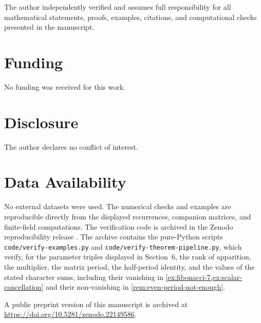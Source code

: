 \documentclass[11pt]{article}
\theoremstyle{plain}
\theoremstyle{definition}
\begin{document}
The author independently verified and assumes full responsibility for all
mathematical statements, proofs, examples, citations, and computational
checks presented in the manuscript.


\section*{Funding}

No funding was received for this work.

\section*{Disclosure}

The author declares no conflict of interest.


\section*{Data Availability}

No external datasets were used. The numerical checks and examples are
reproducible directly from the displayed recurrences, companion matrices,
and finite-field computations. The verification code is archived in the
Zenodo reproducibility release \cite{Ghandali2026HalfPeriodSoftware}. The
archive contains the pure-Python scripts
\texttt{code/verify-examples.py} and
\texttt{code/verify-theorem-pipeline.py}, which verify, for the parameter
triples displayed in Section~6, the rank of apparition, the multiplier, the
matrix period, the half-period identity, and the values of the stated
character sums, including their vanishing in
\cref{ex:fibonacci-7,ex:scalar-cancellation} and their non-vanishing in
\cref{rem:even-period-not-enough}.

A public preprint version of this manuscript is archived at
\url{https://doi.org/10.5281/zenodo.22149586}.


 



\end{document}
